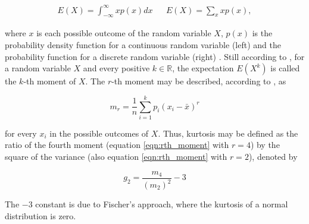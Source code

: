 \begin{align}
\label{eqn:expectation}
E(X) = \int_{-\infty}^{\infty} x p(x)dx
&&
E(X) = \sum_{x} x p(x),
\end{align}

\noindent where $x$ is each possible outcome of the random variable $X$, $p(x)$ is the probability density function for a continuous random variable (left) and the probability function for a discrete random variable (right) \cite{degroot2012probability}. Still according to , for a random variable $X$ and every positive $k \in \mathbb{R}$, the expectation $E(X^{k})$ is
called the $k$-th moment of $X$. The $r$-th moment may be described, according to , as

\begin{equation}
\label{eqn:rth_moment}
m_{r} = \frac{1}{n}
        \sum_{i=1}^{k}p_{i}(x_{i} - \bar{x})^{r}
\end{equation}

\noindent for every $x_{i}$ in the possible outcomes of $X$. Thus, kurtosis may be defined as the ratio of the fourth moment (equation \ref{eqn:rth_moment} with $r = 4$) by the square of the variance (also equation \ref{eqn:rth_moment} with $r = 2$), denoted by

\begin{equation}
\label{eqn:kurtosis}
g_{2} = \frac{m_{4}}{(m_{2})^{2}} - 3
\end{equation}

The $-3$ constant is due to Fischer's approach, where the kurtosis of a normal distribution is zero.